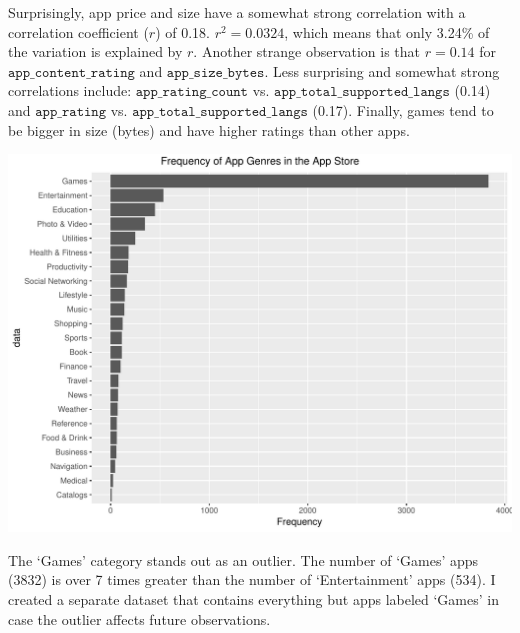 \documentclass[]{article}
\newenvironment{Shaded}{\begin{snugshade}}{\end{snugshade}}
\newcommand{\DataTypeTok}[1]{\textcolor[rgb]{0.13,0.29,0.53}{#1}}
\newcommand{\KeywordTok}[1]{\textcolor[rgb]{0.13,0.29,0.53}{\textbf{#1}}}
\newcommand{\NormalTok}[1]{#1}
\newcommand{\OperatorTok}[1]{\textcolor[rgb]{0.81,0.36,0.00}{\textbf{#1}}}
\newcommand{\StringTok}[1]{\textcolor[rgb]{0.31,0.60,0.02}{#1}}
\begin{document}
Surprisingly, app price and size have a somewhat strong correlation with
a correlation coefficient (\(r\)) of 0.18. \(r^2=0.0324\), which means
that only 3.24\% of the variation is explained by \(r\). Another strange
observation is that \(r=0.14\) for \(\texttt{app\_content\_rating}\) and
\(\texttt{app\_size\_bytes}\). Less surprising and somewhat strong
correlations include: \(\texttt{app\_rating\_count}\) vs.
\(\texttt{app\_total\_supported\_langs}\) (0.14) and
\(\texttt{app\_rating}\) vs. \(\texttt{app\_total\_supported\_langs}\)
(0.17). Finally, games tend to be bigger in size (bytes) and have higher
ratings than other apps.

\newpage

\begin{Shaded}
\end{Shaded}

\begin{center}\includegraphics{Plots/analysis3-1} \end{center}

The `Games' category stands out as an outlier. The number of `Games'
apps (3832) is over 7 times greater than the number of `Entertainment'
apps (534). I created a separate dataset that contains everything but
apps labeled `Games' in case the outlier affects future observations.
\end{document}
